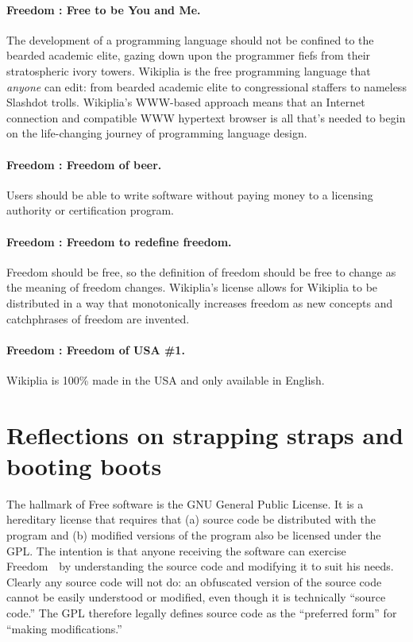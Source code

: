 \documentclass[twocolumn]{article}
\begin{document}
\paragraph{Freedom \ftobe: Free to be You and Me.}
The development of a programming language should not be confined to
the bearded academic elite, gazing down upon the programmer fiefs from
their stratospheric ivory towers. Wikiplia is the free programming
language that {\em anyone} can edit: from bearded academic
elite to congressional staffers to nameless Slashdot
trolls. Wikiplia's WWW-based approach means that an Internet
connection and compatible WWW hypertext browser is all that's needed
to begin on the life-changing journey of programming language design.


\paragraph{Freedom \fbeer: Freedom of beer.}
Users should be able to write software without paying money to a
licensing authority or certification program.

\paragraph{Freedom \ffree: Freedom to redefine freedom.}
Freedom should be free, so the definition of freedom should be free to
change as the meaning of freedom changes. Wikiplia's license allows
for Wikiplia to be distributed in a way that monotonically increases
freedom as new concepts and catchphrases of freedom are invented.

\paragraph{Freedom \fusa: Freedom of USA \#1.}
Wikiplia is 100\% made in the USA and only available in
English.\z{}


\section{Reflections on strapping straps and booting boots} \label{sec:bootstrap}

The hallmark of Free software is the GNU General Public License. It is
a hereditary license that requires that (a) source code be distributed
with the program and (b) modified versions of the program also be
licensed under the GPL. The intention is that anyone receiving the
software can exercise Freedom~\ftinker\ by understanding the source
code and modifying it to suit his needs. Clearly any source code will
not do: an obfuscated version of the source
code cannot be easily understood or modified, even though it is
technically ``source code.'' The GPL therefore legally defines source
code as the ``preferred form'' for ``making modifications.''
\end{document}
